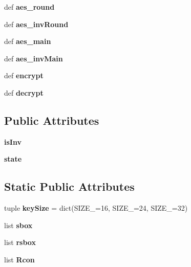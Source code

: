 \begin{DoxyCompactItemize}
\item 
\hypertarget{classslowaes_1_1_a_e_s_a5992fa8d15053642fd7d9d8c5a3c5540}{def {\bfseries aes\-\_\-round}}\label{classslowaes_1_1_a_e_s_a5992fa8d15053642fd7d9d8c5a3c5540}

\item 
\hypertarget{classslowaes_1_1_a_e_s_aad02794fa7ed1accc7581d76300ce8f5}{def {\bfseries aes\-\_\-inv\-Round}}\label{classslowaes_1_1_a_e_s_aad02794fa7ed1accc7581d76300ce8f5}

\item 
\hypertarget{classslowaes_1_1_a_e_s_a13dd8f92140cd60bea960d791ba5183d}{def {\bfseries aes\-\_\-main}}\label{classslowaes_1_1_a_e_s_a13dd8f92140cd60bea960d791ba5183d}

\item 
\hypertarget{classslowaes_1_1_a_e_s_aba8a4f1107bd444dd98c9028fd013c04}{def {\bfseries aes\-\_\-inv\-Main}}\label{classslowaes_1_1_a_e_s_aba8a4f1107bd444dd98c9028fd013c04}

\item 
\hypertarget{classslowaes_1_1_a_e_s_a74568e45c5071460243f2622941fe490}{def {\bfseries encrypt}}\label{classslowaes_1_1_a_e_s_a74568e45c5071460243f2622941fe490}

\item 
\hypertarget{classslowaes_1_1_a_e_s_ad85d79a9c0088dc46b4268cae8e2f054}{def {\bfseries decrypt}}\label{classslowaes_1_1_a_e_s_ad85d79a9c0088dc46b4268cae8e2f054}

\end{DoxyCompactItemize}
\subsection*{Public Attributes}
\begin{DoxyCompactItemize}
\item 
\hypertarget{classslowaes_1_1_a_e_s_a0467d80b43c5ecdf52449278e77213a2}{{\bfseries is\-Inv}}\label{classslowaes_1_1_a_e_s_a0467d80b43c5ecdf52449278e77213a2}

\item 
\hypertarget{classslowaes_1_1_a_e_s_a2df59652d33001ff70537bf5dbb6332b}{{\bfseries state}}\label{classslowaes_1_1_a_e_s_a2df59652d33001ff70537bf5dbb6332b}

\end{DoxyCompactItemize}
\subsection*{Static Public Attributes}
\begin{DoxyCompactItemize}
\item 
\hypertarget{classslowaes_1_1_a_e_s_a0c4485dde2ec4bb0a3d80e8ccad93836}{tuple {\bfseries key\-Size} = dict(S\-I\-Z\-E\-\_=16, S\-I\-Z\-E\-\_=24, S\-I\-Z\-E\-\_=32)}\label{classslowaes_1_1_a_e_s_a0c4485dde2ec4bb0a3d80e8ccad93836}

\item 
list {\bfseries sbox}
\item 
list {\bfseries rsbox}
\item 
list {\bfseries Rcon}
\end{DoxyCompactItemize}


